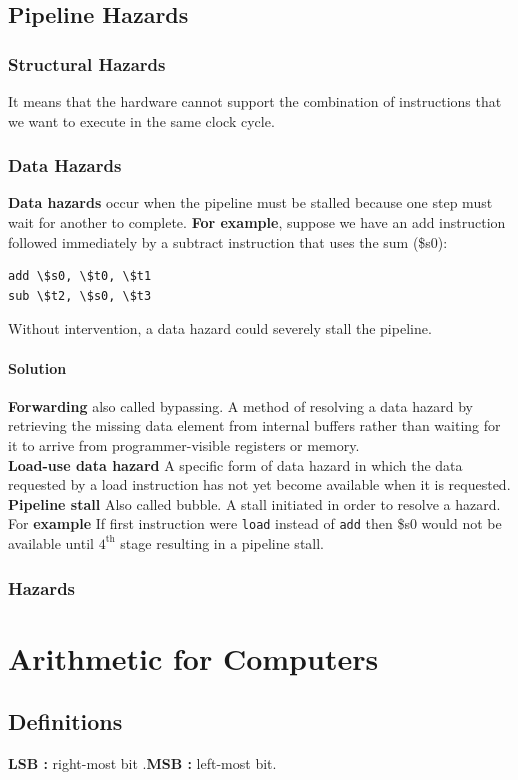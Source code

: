 \documentclass[a4paper,oneside]{book}
\begin{document}
\section{Pipeline Hazards}
\subsection{Structural Hazards}
 It means that the hardware cannot support the combination of instructions that we want to execute in the same clock cycle. 
\subsection{Data Hazards}
\textbf{Data hazards} occur when the pipeline must be stalled because one step must wait for another to complete.
\textbf{For example}, suppose we have an add instruction followed immediately by a subtract instruction that uses the sum (\$s0):
\begin{verbatim}
add \$s0, \$t0, \$t1
sub \$t2, \$s0, \$t3
\end{verbatim}
Without intervention, a data hazard could severely stall the pipeline. 
\subsubsection{Solution}
\textbf{Forwarding} also called bypassing. A method of resolving a data hazard by retrieving the missing data element from internal buffers rather than waiting for it to arrive from programmer-visible registers or memory. \\
\textbf{Load-use data hazard} A specific form of data hazard in which the data requested by a load instruction has not yet become available when it is requested. \textbf{Pipeline stall} Also called bubble. A stall initiated in order to resolve a hazard.\\
For \textbf{example} If first instruction were \texttt{load} instead of \texttt{add} then \$s0 would not be available until $4^{\text{th}}$ stage resulting in a pipeline stall.
\subsection{Hazards}
\chapter{Arithmetic for Computers}
\section{Definitions}
\begin{definition}
\textbf{LSB :} right-most bit .\textbf{MSB :} left-most bit.
\end{definition}
\end{document}
